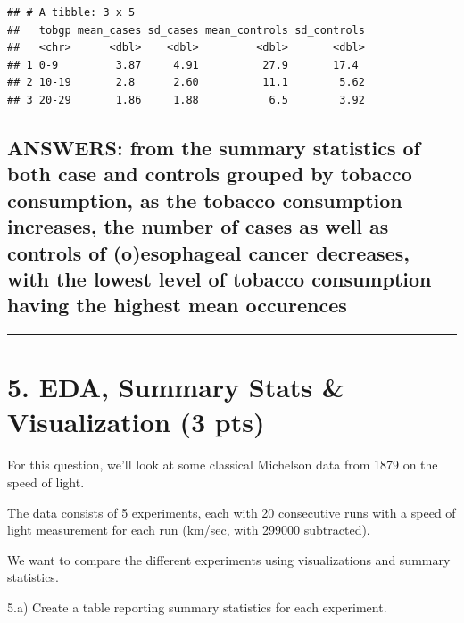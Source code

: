 \documentclass[
]{article}
\begin{document}
\begin{verbatim}
## # A tibble: 3 x 5
##   tobgp mean_cases sd_cases mean_controls sd_controls
##   <chr>      <dbl>    <dbl>         <dbl>       <dbl>
## 1 0-9         3.87     4.91          27.9       17.4 
## 2 10-19       2.8      2.60          11.1        5.62
## 3 20-29       1.86     1.88           6.5        3.92
\end{verbatim}

\hypertarget{answers-from-the-summary-statistics-of-both-case-and-controls-grouped-by-tobacco-consumption-as-the-tobacco-consumption-increases-the-number-of-cases-as-well-as-controls-of-oesophageal-cancer-decreases-with-the-lowest-level-of-tobacco-consumption-having-the-highest-mean-occurences}{%
\subsection{ANSWERS: from the summary statistics of both case and
controls grouped by tobacco consumption, as the tobacco consumption
increases, the number of cases as well as controls of (o)esophageal
cancer decreases, with the lowest level of tobacco consumption having
the highest mean
occurences}\label{answers-from-the-summary-statistics-of-both-case-and-controls-grouped-by-tobacco-consumption-as-the-tobacco-consumption-increases-the-number-of-cases-as-well-as-controls-of-oesophageal-cancer-decreases-with-the-lowest-level-of-tobacco-consumption-having-the-highest-mean-occurences}}

\begin{center}\rule{0.5\linewidth}{0.5pt}\end{center}

\hypertarget{eda-summary-stats-visualization-3-pts}{%
\section{5. EDA, Summary Stats \& Visualization (3
pts)}\label{eda-summary-stats-visualization-3-pts}}

For this question, we'll look at some classical Michelson data from 1879
on the speed of light.

The data consists of 5 experiments, each with 20 consecutive runs with a
speed of light measurement for each run (km/sec, with 299000
subtracted).

We want to compare the different experiments using visualizations and
summary statistics.

5.a) Create a table reporting summary statistics for each experiment.
\end{document}
